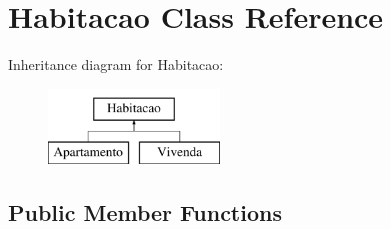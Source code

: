 \hypertarget{class_habitacao}{}\section{Habitacao Class Reference}
\label{class_habitacao}
Inheritance diagram for Habitacao\+:\begin{figure}[H]
\begin{center}
\leavevmode
\includegraphics[height=2.000000cm]{class_habitacao}
\end{center}
\end{figure}
\subsection*{Public Member Functions}
